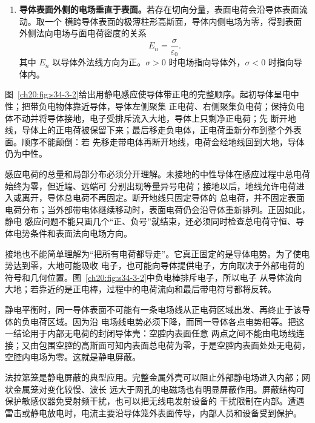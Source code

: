 {\begin{enumerate}[label=\arabic*.]
  \item \textbf{导体表面外侧的电场垂直于表面。}若存在切向分量，表面电荷会沿导体表面流动。取一个
  横跨导体表面的极薄柱形高斯面，导体内侧电场为零，得到表面外侧法向电场与面电荷密度的关系
  \begin{equation}
    \boxed{E_n=\frac{\sigma}{\varepsilon_0}}.
  \end{equation}
  其中 $E_n$ 以导体外法线方向为正。$\sigma>0$ 时电场指向导体外，$\sigma<0$ 时指向导体内。
\end{enumerate}

图~\ref{ch20:fig:s34-3-2}给出用静电感应使导体带正电的完整顺序。起初导体呈电中性；把带负电物体靠近导体，导体左侧聚集
正电荷、右侧聚集负电荷；保持负电体不动并将导体接地，电子受排斥流入大地，导体上只剩净正电荷；先
断开地线，导体上的正电荷被保留下来；最后移走负电体，正电荷重新分布到整个外表面。顺序不能颠倒：若
先移走带电体再断开地线，电荷会经地线回到大地，导体仍为中性。

\par\noindent\begin{minipage}{\linewidth}
\inductionSequenceFigure
{}\label{ch20:fig:s34-3-2}
\end{minipage}\par\medskip

感应电荷的总量和局部分布必须分开理解。未接地的中性导体在感应过程中总电荷始终为零，但近端、远端可
分别出现等量异号电荷；接地以后，地线允许电荷进入或离开，导体总电荷不再固定。断开地线只固定导体的
总电荷，并不固定表面电荷分布；当外部带电体继续移动时，表面电荷仍会沿导体重新排列。正因如此，静电
感应问题不能只画几个“正、负号”就结束，还必须同时检查总电荷守恒、导体电势条件和表面法向电场方向。

接地也不能简单理解为“把所有电荷都导走”。它真正固定的是导体电势。为了使电势达到零，大地可能吸收
电子，也可能向导体提供电子，方向取决于外部电荷的符号和几何位置。图~\ref{ch20:fig:s34-3-2}中负电棒排斥电子，所以电子
从导体流向大地；若靠近的是正电棒，过程中的电荷流向和最后带电符号都将反转。

静电平衡时，同一导体表面不可能有一条电场线从正电荷区域出发、再终止于该导体的负电荷区域。因为沿
电场线电势必须下降，而同一导体各点电势相等。把这一结论用于内部无电荷的封闭导体壳：空腔内表面任意
两点之间不能由电场线连接；又由包围空腔的高斯面可知内表面总电荷为零，于是空腔内表面处处无电荷，
空腔内电场为零。这就是静电屏蔽。

法拉第笼是静电屏蔽的典型应用。完整金属外壳可以阻止外部静电场进入内部；网状金属笼对变化较慢、波长
远大于网孔的电磁场也有明显屏蔽作用。屏蔽结构可保护敏感仪器免受射频干扰，也可以把无线电发射设备的
干扰限制在内部。遭遇雷击或静电放电时，电流主要沿导体笼外表面传导，内部人员和设备受到保护。

}
